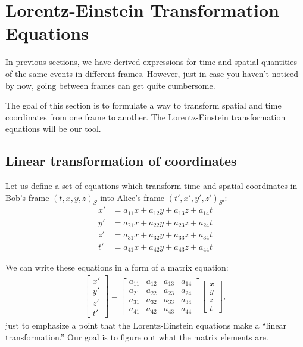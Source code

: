 \documentclass[a4paper,11pt]{article}
\numberwithin{equation}{section}
\begin{document}
 \newpage
 
 \section{Lorentz-Einstein Transformation Equations}
 In previous sections, we have derived expressions for time and spatial quantities of the same events in different frames. However, just in case you haven't noticed by now, going between frames can get quite cumbersome. 
 
 \noindent The goal of this section is to formulate a way to transform spatial and time coordinates from one frame to another. The Lorentz-Einstein transformation equations will be our tool. 
 
 \subsection{Linear transformation of coordinates}
 Let us define a set of equations which transform time and spatial coordinates in Bob's frame $(t,x,y,z)_S$ into Alice's frame $(t',x',y',z')_{S'}$:
 \begin{equation}
 \begin{split}
 x'&=a_{11}x + a_{12}y + a_{13}z + a_{14}t \\
 y'&=a_{21}x + a_{22}y + a_{23}z + a_{24}t \\
 z'&=a_{31}x + a_{32}y + a_{33}z + a_{34}t \\
 t'&=a_{41}x + a_{42}y + a_{43}z + a_{44}t 
 \end{split}
 \end{equation}
 
 \noindent We can write these equations in a form of a matrix equation:
 \begin{gather}
 \begin{bmatrix} x' \\ y' \\ z' \\ t' \end{bmatrix}
 =
 \begin{bmatrix}
 a_{11} & a_{12} & a_{13} & a_{14}\\
 a_{21} & a_{22} & a_{23} & a_{24}\\
 a_{31} & a_{32} & a_{33} & a_{34}\\
 a_{41} & a_{42} & a_{43} & a_{44}
 \end{bmatrix}
 \begin{bmatrix}
 x \\ y \\ z \\ t
 \end{bmatrix},
 \end{gather}
 just to emphasize a point that the Lorentz-Einstein equations make a ``linear transformation.'' Our goal is to figure out what the matrix elements are. 
\end{document}
